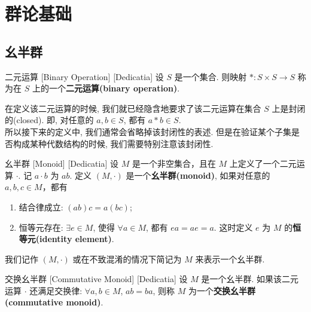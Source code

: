 \section{群论基础}

    \subsection{幺半群}

        \begin{dfn}
            {二元运算}
            [Binary Operation]
            [Dedicatia]
            设 \(S\) 是一个集合. 则映射 \(\ast:S\times S\to S\) 称为在 \(S\) 上的一个\textbf{二元运算(binary operation)}.
        \end{dfn}

        \begin{rmk}
            [Dedicatia]
            在定义该二元运算的时候, 我们就已经隐含地要求了该二元运算在集合 \(S\) 上是封闭的(closed). 即, 对任意的 \(a,b\in S\), 都有 \(a\ast b\in S\).\\
            所以接下来的定义中, 我们通常会省略掉该封闭性的表述. 但是在验证某个子集是否构成某种代数结构的时候, 我们需要特别注意该封闭性.
        \end{rmk}

        \begin{dfn}
            [Monoid]
            {幺半群}
            [Monoid]
            [Dedicatia]
            设 \(M\) 是一个非空集合，且在 \(M\) 上定义了一个二元运算 \(\cdot\). 记 \(a\cdot b\) 为 \(ab\). 定义 \((M,\cdot)\) 是一个\textbf{幺半群(monoid)}, 如果对任意的 \(a,b,c\in M\)，都有
            \begin{enumerate}
                \item 结合律成立: \((ab)c=a(bc)\);
                \item 恒等元存在: \(\exists e\in M\), 使得 \(\forall a\in M\), 都有 \(ea=ae=a\). 这时定义 \(e\) 为 \(M\) 的\textbf{恒等元(identity element)}.
            \end{enumerate}
            我们记作 \((M,\cdot)\) 或在不致混淆的情况下简记为 \(M\) 来表示一个幺半群.
        \end{dfn}

        \begin{dfn}
            {交换幺半群}
            [Commutative Monoid]
            [Dedicatia]
            设 \(M\) 是一个幺半群. 如果该二元运算 \(\cdot\) 还满足交换律: \(\forall a,b\in M\), \(ab=ba\), 则称 \(M\) 为一个\textbf{交换幺半群(commutative monoid)}.
        \end{dfn}

